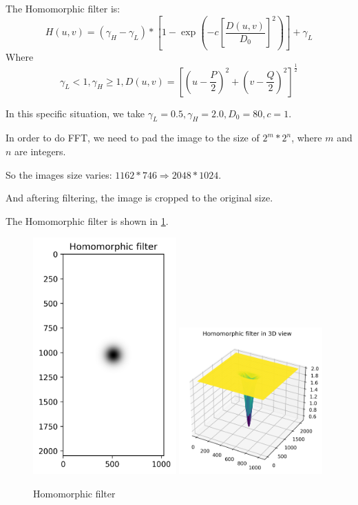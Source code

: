 The Homomorphic filter is:
$$H(u,v)=(\gamma_H-\gamma_L)*\left[1-\exp\left(-c\left[\dfrac{D(u,v)}{D_0}\right]^2\right)\right]+\gamma_L$$
Where
$$\gamma_L<1,\gamma_H\geq 1,D(u,v)=\left[\left(u-\dfrac{P}{2}\right)^2+\left(v-\dfrac{Q}{2}\right)^2\right]^\frac{1}{2}$$

In this specific situation, we take $\gamma_L = 0.5, \gamma_H = 2.0, D_0 = 80, c = 1$.

In order to do FFT, we need to pad the image to the size of $2^m*2^n$, where $m$ and $n$ are integers.

So the images size varies: $1162*746\Rightarrow 2048*1024$.

And aftering filtering, the image is cropped to the original size.

The Homomorphic filter is shown in \ref{fig:p2_filter}.
\begin{figure}[htbp]
    \centering
	\includegraphics[width=0.49\textwidth]{../images/p2/p2a_filter.png}
	\includegraphics[width=0.49\textwidth]{../images/p2/p2a_filter_3D.png}
    \caption{Homomorphic filter}
    \label{fig:p2_filter}
\end{figure}
\\

